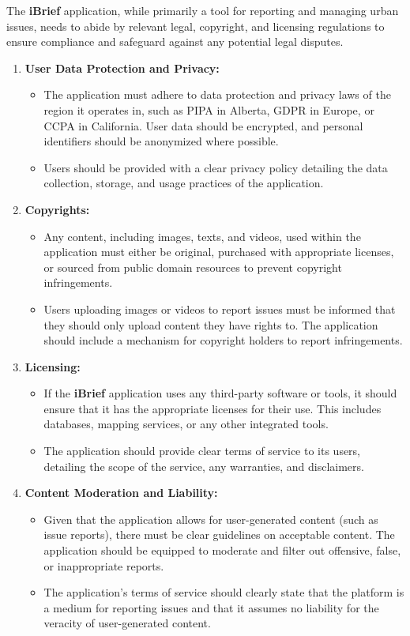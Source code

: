 The \textbf{iBrief} application, while primarily a tool for reporting and managing urban issues, needs to abide by relevant legal, copyright, and licensing regulations to ensure compliance and safeguard against any potential legal disputes.

\begin{enumerate}
    \item \textbf{User Data Protection and Privacy:}
    \begin{itemize}
        \item The application must adhere to data protection and privacy laws of the region it operates in, such as \gls{PIPA} in Alberta, \gls{GDPR} in Europe, or \gls{CCPA} in California. User data should be encrypted, and personal identifiers should be anonymized where possible.
        \item Users should be provided with a clear privacy policy detailing the data collection, storage, and usage practices of the application.
    \end{itemize}

    \item \textbf{Copyrights:}
    \begin{itemize}
        \item Any content, including images, texts, and videos, used within the application must either be original, purchased with appropriate licenses, or sourced from public domain resources to prevent copyright infringements.
        \item Users uploading images or videos to report issues must be informed that they should only upload content they have rights to. The application should include a mechanism for copyright holders to report infringements.
    \end{itemize}
    
    \item \textbf{Licensing:}
    \begin{itemize}
        \item If the \textbf{iBrief} application uses any third-party software or tools, it should ensure that it has the appropriate licenses for their use. This includes databases, mapping services, or any other integrated tools.
        \item The application should provide clear terms of service to its users, detailing the scope of the service, any warranties, and disclaimers.
    \end{itemize}
    
    \item \textbf{Content Moderation and Liability:}
    \begin{itemize}
        \item Given that the application allows for user-generated content (such as issue reports), there must be clear guidelines on acceptable content. The application should be equipped to moderate and filter out offensive, false, or inappropriate reports.
        \item The application's terms of service should clearly state that the platform is a medium for reporting issues and that it assumes no liability for the veracity of user-generated content.
    \end{itemize}
    

\end{enumerate}
